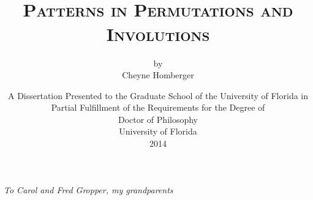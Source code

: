 \documentclass[12pt,twoside]{memoir}
\begin{document}
\thispagestyle{empty}


\pretitle{ \begin{center}}
\title{\vspace{-6pc} \hrulefill \\ {\scshape \LARGE Patterns in Permutations and
    Involutions\\[6pt]}}
\author{{\small by} \\[4pc] Cheyne Homberger}
\predate{\vfill\begin{center}\normalsize}


\date{\vspace{4pc} A Dissertation Presented to the Graduate School of the University
of Florida in Partial Fulfillment of the Requirements for the Degree of \\
Doctor of Philosophy \\[1pc]
University of Florida \\[1pc]
2014}
\maketitle
\thispagestyle{empty}


\cleardoublepage 

\thispagestyle{empty}

\begin{center} \itshape
  \vspace*{.4\textheight}
  To Carol and Fred Gropper, my grandparents
\end{center}
\cleardoublepage




\frontmatter



\cleardoublepage
\end{document}
